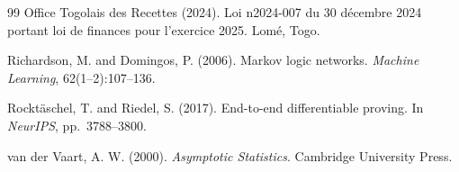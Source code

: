 \documentclass[letterpaper]{article}
\begin{document}
\begin{thebibliography}{99}
Office Togolais des Recettes (2024).
Loi n\textdegree{}2024-007 du 30 d\'ecembre 2024 portant loi de finances
pour l'exercice 2025. Lom\'e, Togo.

Richardson, M. and Domingos, P. (2006).
Markov logic networks.
\textit{Machine Learning}, 62(1--2):107--136.

Rockt{\"a}schel, T. and Riedel, S. (2017).
End-to-end differentiable proving.
In \textit{NeurIPS}, pp.\ 3788--3800.

van der Vaart, A. W. (2000).
\textit{Asymptotic Statistics}.
Cambridge University Press.

\end{thebibliography}

\appendix

\end{document}
